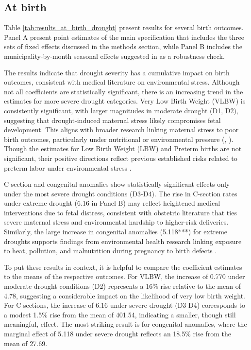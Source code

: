 \documentclass[12pt, oneside]{article}      %
\begin{document}
\subsection{At birth}

Table \ref{tab:results_at_birth_drought} present results for several birth outcomes. Panel A present point estimates of the main specification that includes the three sets of fixed effects discussed in the methods section, while Panel B includes the municipality-by-month seasonal effects suggested in \cite{Cohen2022} as a robustness check.

The results indicate that drought severity has a cumulative impact on birth outcomes, consistent with medical literature on environmental stress. Although not all coefficients are statistically significant, there is an increasing trend in the estimates for more severe drought categories. Very Low Birth Weight (VLBW) is consistently significant, with larger magnitudes in moderate drought (D1, D2), suggesting that drought-induced maternal stress likely compromises fetal development. This aligns with broader research linking maternal stress to poor birth outcomes, particularly under nutritional or environmental pressure (\cite{Ha2022}, \cite{Meherali2024}). Though the estimates for Low Birth Weight (LBW) and Preterm births are not significant, their positive directions reflect previous established risks related to preterm labor under environmental stress \cite{Jain2021}.

C-section and congenital anomalies show statistically significant effects only under the most severe drought conditions (D3-D4). The rise in C-section rates under extreme drought (6.16 in Panel B) may reflect heightened medical interventions due to fetal distress, consistent with obstetric literature that ties severe maternal stress and environmental hardship to higher-risk deliveries. Similarly, the large increase in congenital anomalies (5.118***) for extreme droughts supports findings from environmental health research linking exposure to heat, pollution, and malnutrition during pregnancy to birth defects \cite{Ha2022}.

To put these results in context, it is helpful to compare the coefficient estimates to the means of the respective outcomes. For VLBW, the increase of 0.770 under moderate drought conditions (D2) represents a 16\% rise relative to the mean of 4.78, suggesting a considerable impact on the likelihood of very low birth weight. For C-sections, the increase of 6.16 under severe drought (D3-D4) corresponds to a modest 1.5\% rise from the mean of 401.54, indicating a smaller, though still meaningful, effect. The most striking result is for congenital anomalies, where the marginal effect of 5.118 under severe drought reflects an 18.5\% rise from the mean of 27.69.
\end{document}
